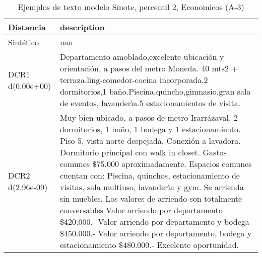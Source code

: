 \begin{table}[H]
\centering
\fontsize{10}{14}\selectfont
\caption{Ejemplos de texto modelo Smote, percentil 2, Economicos (A-3)}
\label{table-example-economicos-a-3-smote-enc-2p-text}
\begin{tabular}{|l|m{35em}|}
\hline
\rowcolor[gray]{0.8}
Distancia & description \\
\hline Sintético & nan \\
\hline DCR1 d(0.00e+00) & Departamento amoblado,excelente ubicaci\'on y orientaci\'on, a pasos del metro Moneda. 40 mts2 + terraza.ling-comedor-cocina incorporada,2 dormitorios,1 ba\~no.Piscina,quincho,gimnasio,gran sala de eventos, lavander{\'\i}a.5 estacionamientos de visita. \\
\hline DCR2 d(2.96e-09) & Muy bien ubicado, a pasos de metro Irarr\'azaval.   2 dormitorios, 1 ba\~no, 1 bodega y 1 estacionamiento.  Piso 5, vista norte despejada.   Conexi\'on a lavadora.   Dormitorio principal con walk in closet.  Gastos comunes \$75.000 aproximadamente.   Espacios comunes cuentan con: Piscina, quinchos, estacionamiento de visitas, sala multiuso, lavander{\'\i}a y gym.  Se arrienda sin muebles.  Los valores de arriendo son totalmente conversables Valor arriendo por departamento \$420.000.- Valor arriendo por departamento y bodega \$450.000.- Valor arriendo por departamento, bodega y estacionamiento \$480.000.-  Excelente oportunidad. \\
\hline
\end{tabular}
\end{table}
